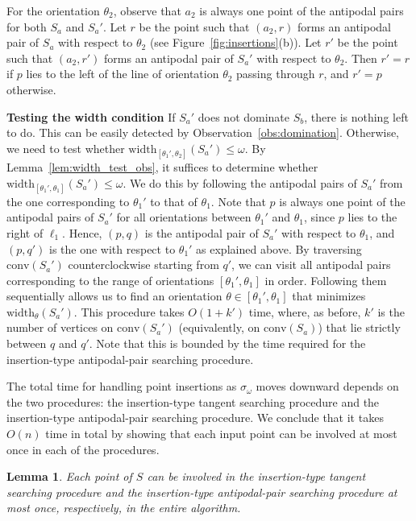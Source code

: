 \documentclass[10pt,a4paper]{article}
\newtheorem{lemma}[theorem]{Lemma}
\theoremstyle{star}
\theoremstyle{claimstar}
\newcommand{\width}{\ensuremath{\mathrm{width}}}
\newcommand{\conv}{\ensuremath{\mathrm{conv}}}
\begin{document}
For the orientation $\theta_2$, observe that $a_2$ is always one point of the antipodal pairs for both $S_a$ and $S_a'$. 
Let $r$ be the point such that $(a_2, r)$ forms an antipodal pair of $S_a$ with respect to $\theta_2$ (see Figure~\ref{fig:insertions}(b)). 
Let $r'$ be the point such that $(a_2, r')$ forms an antipodal pair of $S_a'$ with respect to $\theta_2$. 
Then $r' = r$ if $p$ lies to the left of the line of orientation $\theta_2$ passing through $r$, and $r' = p$ otherwise. 

\textbf{Testing the width condition }
If $S_a'$ does not dominate $S_b$, there is nothing left to do.
This can be easily detected by Observation~\ref{obs:domination}.
Otherwise, we need to test whether $\width_{[\theta_1', \theta_2]}(S_a') \le \omega$.
By Lemma~\ref{lem:width_test_obs}, it suffices to determine whether $\width_{[\theta_1', \theta_1]}(S_a') \le \omega$.
We do this by following the antipodal pairs of $S_a'$ from the one corresponding to $\theta_1'$ to that of $\theta_1$.
Note that $p$ is always one point of the antipodal pairs of $S_a'$ for all orientations between $\theta_1'$ and $\theta_1$, since $p$ lies to the right of $\ell_1$.
Hence, $(p, q)$ is the antipodal pair of $S_a'$ with respect to $\theta_1$, and $(p, q')$ is the one with respect to $\theta_1'$ as explained above.
By traversing $\conv(S_a')$ counterclockwise starting from $q'$, we can visit all antipodal pairs corresponding to the range of orientations $[\theta_1', \theta_1]$ in order.
Following them sequentially allows us to find an orientation $\theta \in [\theta_1', \theta_1]$ that minimizes $\width_\theta(S_a')$.
This procedure takes $O(1 + k')$ time, where, as before, $k'$ is the number of vertices on $\conv(S_a')$ (equivalently, on $\conv(S_a)$) that lie strictly between $q$ and $q'$.
Note that this is bounded by the time required for the insertion-type antipodal-pair searching procedure.





\medbreak
The total time for handling point insertions as $\sigma_\omega$ moves downward depends on the two procedures: the insertion-type tangent searching procedure and the insertion-type antipodal-pair searching procedure. 
We conclude that it takes $O(n)$ time in total by showing that each input point can be involved at most once in each of the procedures.


\begin{lemma}
    \label{lem:insertion_time}
    Each point of $S$ can be involved in the insertion-type tangent searching procedure and the insertion-type antipodal-pair searching procedure at most once, respectively, in the entire algorithm.
\end{lemma}
\end{document}

